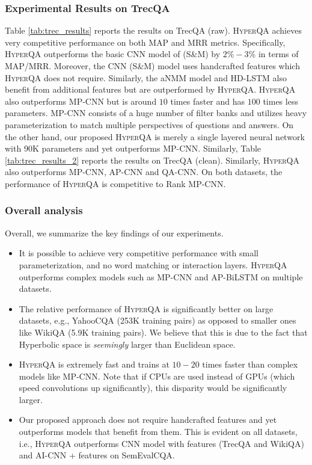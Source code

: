 \documentclass[sigconf]{acmart}
\begin{document}
\subsubsection{Experimental Results on TrecQA}
Table \ref{tab:trec_results} reports the results on TrecQA (raw). \textsc{HyperQA} achieves very competitive performance on both MAP and MRR metrics. Specifically, \textsc{HyperQA} outperforms the basic CNN model of (S\&M) by  $2\%-3\%$ in terms of MAP/MRR. Moreover, the CNN (S\&M) model uses handcrafted features which \textsc{HyperQA} does not require. Similarly, the aNMM model and HD-LSTM also benefit from additional features but are outperformed by \textsc{HyperQA}. \textsc{HyperQA} also outperforms MP-CNN but is around $10$ times faster and has $100$ times less parameters. MP-CNN consists of a huge number of filter banks and utilizes heavy parameterization to match multiple perspectives of questions and answers. On the other hand, our proposed \textsc{HyperQA} is merely a single layered neural network with 90K parameters and yet outperforms MP-CNN. Similarly, Table \ref{tab:trec_results_2} reports the results on TrecQA (clean). Similarly, \textsc{HyperQA} also outperforms MP-CNN, AP-CNN and QA-CNN. On both datasets, the performance of \textsc{HyperQA} is competitive to Rank MP-CNN. 



\subsubsection{Overall analysis}
Overall, we summarize the key findings of our experiments.
\begin{itemize}
\item It is possible to achieve very competitive performance with small parameterization, and no word matching or interaction layers. \textsc{HyperQA} outperforms complex models such as MP-CNN and AP-BiLSTM on multiple datasets. 
\item The relative performance of \textsc{HyperQA} is significantly better on large datasets, e.g., YahooCQA (253K training pairs) as opposed to smaller ones like WikiQA (5.9K training pairs). We believe that this is due to the fact that Hyperbolic space is \textit{seemingly} larger than Euclidean space. 
\item \textsc{HyperQA} is extremely fast and trains at $10-20$ times faster than complex models like MP-CNN. Note that if CPUs are used instead of GPUs (which speed convolutions up significantly), this disparity would be significantly larger. 
\item Our proposed approach does not require handcrafted features and yet outperforms models that benefit from them. This is evident on all datasets, i.e., \textsc{HyperQA} outperforms CNN model with features (TrecQA and WikiQA) and AI-CNN + features on SemEvalCQA. 
\end{itemize}
\end{document}
